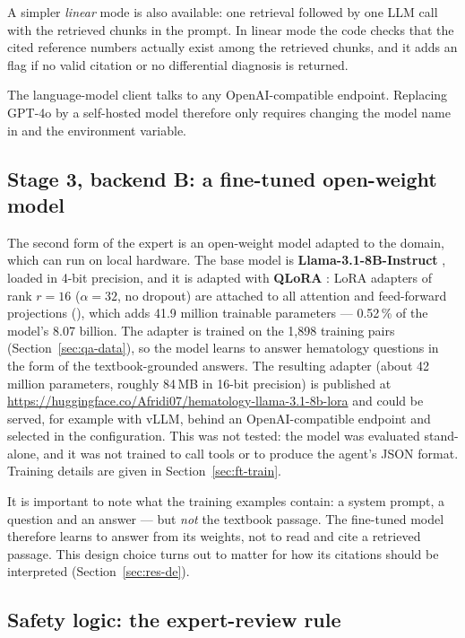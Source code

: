 A simpler \emph{linear} mode is also available: one retrieval followed by one LLM call with the retrieved chunks in the prompt. In linear mode the code checks that the cited reference numbers actually exist among the retrieved chunks, and it adds an  flag if no valid citation or no differential diagnosis is returned.

The language-model client talks to any OpenAI-compatible endpoint. Replacing GPT-4o by a self-hosted model therefore only requires changing the model name in  and the  environment variable.

\subsection{Stage 3, backend B: a fine-tuned open-weight model}\label{sec:ft}

The second form of the expert is an open-weight model adapted to the domain, which can run on local hardware. The base model is \textbf{Llama-3.1-8B-Instruct} \cite{grattafiori2024llama3}, loaded in 4-bit precision, and it is adapted with \textbf{QLoRA} \cite{dettmers2023qlora}: LoRA adapters of rank $r=16$ ($\alpha = 32$, no dropout) are attached to all attention and feed-forward projections (), which adds 41.9 million trainable parameters --- 0.52\,\% of the model's 8.07 billion. The adapter is trained on the 1{,}898 training pairs (Section~\ref{sec:qa-data}), so the model learns to answer hematology questions in the form of the textbook-grounded answers. The resulting adapter (about 42 million parameters, roughly 84\,MB in 16-bit precision) is published at \url{https://huggingface.co/Afridi07/hematology-llama-3.1-8b-lora} and could be served, for example with vLLM, behind an OpenAI-compatible endpoint and selected in the configuration. This was not tested: the model was evaluated stand-alone, and it was not trained to call tools or to produce the agent's JSON format. Training details are given in Section~\ref{sec:ft-train}.

It is important to note what the training examples contain: a system prompt, a question and an answer --- but \emph{not} the textbook passage. The fine-tuned model therefore learns to answer from its weights, not to read and cite a retrieved passage. This design choice turns out to matter for how its citations should be interpreted (Section~\ref{sec:res-de}).

\subsection{Safety logic: the expert-review rule}\label{sec:safety}

